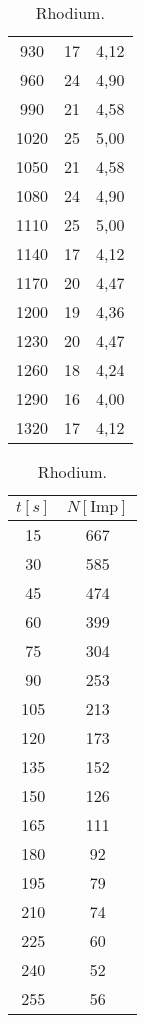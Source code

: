 \begin{table}
\begin{minipage}{.5\linewidth}
\begin{tabular}{c c c}
        930   & 17  & 4{,}12\\
        960   & 24  & 4{,}90\\
        990   & 21  & 4{,}58\\
        1020  & 25  & 5{,}00\\
        1050  & 21  & 4{,}58\\
        1080  & 24  & 4{,}90\\
        1110  & 25  & 5{,}00\\
        1140  & 17  & 4{,}12\\
        1170  & 20  & 4{,}47\\
        1200  & 19  & 4{,}36\\
        1230  & 20  & 4{,}47\\
        1260  & 18  & 4{,}24\\
        1290  & 16  & 4{,}00\\
        1320  & 17 & 4{,}12\\
            \bottomrule
        \end{tabular}
    \end{minipage}
    \begin{minipage}{.5\linewidth}
        \centering
            \caption{Rhodium.}
            \label{tab:Rhodium}
            \begin{tabular}{c c}
            \toprule   
             $t[s]$ & $N [\text{Imp}]$ \\
            \midrule
            15	 & 667 \\
            30	 & 585 \\	 
            45	 & 474 \\
            60	 & 399 \\
            75	 & 304 \\
            90	 & 253 \\
            105	 & 213 \\
            120	 & 173 \\
            135	 & 152 \\
            150	 & 126 \\
            165	 & 111 \\
            180	 &  92 \\
            195	 &  79 \\
            210	 &  74 \\
            225	 &  60 \\
            240	 &  52 \\
            255	 &  56 \\

\end{tabular}
\end{minipage}
\end{table}
